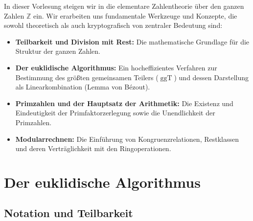 

\begin{nice-box}
In dieser Vorlesung steigen wir in die elementare Zahlentheorie über den ganzen Zahlen $\mathbb{Z}$ ein. Wir erarbeiten uns fundamentale Werkzeuge und Konzepte, die sowohl theoretisch als auch kryptografisch von zentraler Bedeutung sind:
\begin{itemize}
    \item \textbf{Teilbarkeit und Division mit Rest:} Die mathematische Grundlage für die Struktur der ganzen Zahlen.
    \item \textbf{Der euklidische Algorithmus:} Ein hocheffizientes Verfahren zur Bestimmung des größten gemeinsamen Teilers ($\operatorname{ggT}$) und dessen Darstellung als Linearkombination (Lemma von Bézout).
    \item \textbf{Primzahlen und der Hauptsatz der Arithmetik:} Die Existenz und Eindeutigkeit der Primfaktorzerlegung sowie die Unendlichkeit der Primzahlen.
    \item \textbf{Modularrechnen:} Die Einführung von Kongruenzrelationen, Restklassen und deren Verträglichkeit mit den Ringoperationen.
\end{itemize}
\end{nice-box}

\section{Der euklidische Algorithmus}
\subsection{Notation und Teilbarkeit}

